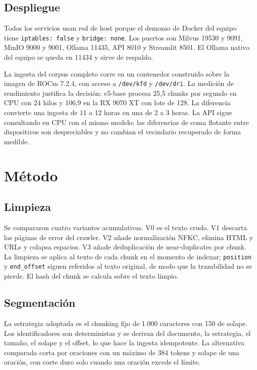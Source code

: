 \documentclass[11pt]{tg_usta}
\begin{document}
\clearpage
\subsection{Despliegue}

Todos los servicios usan red de host porque el demonio de Docker del equipo tiene \texttt{iptables:~false} y \texttt{bridge:~none}. Los puertos son Milvus 19530 y 9091, MinIO 9000 y 9001, Ollama 11435, API 8010 y Streamlit 8501. El Ollama nativo del equipo se queda en 11434 y sirve de respaldo.

La ingesta del corpus completo corre en un contenedor construido sobre la imagen de ROCm 7.2.4, con acceso a \texttt{/dev/kfd} y \texttt{/dev/dri}. La medición de rendimiento justifica la decisión: e5-base procesa 25,5 chunks por segundo en CPU con 24 hilos y 106,9 en la RX 9070 XT con lote de 128. La diferencia convierte una ingesta de 11 a 12 horas en una de 2 a 3 horas. La API sigue consultando en CPU con el mismo modelo; las diferencias de coma flotante entre dispositivos son despreciables y no cambian el vecindario recuperado de forma medible.

\section{Método}

\subsection{Limpieza}

Se compararon cuatro variantes acumulativas. V0 es el texto crudo. V1 descarta las páginas de error del crawler. V2 añade normalización NFKC, elimina HTML y URLs y colapsa espacios. V3 añade deduplicación de near-duplicates por chunk. La limpieza se aplica al texto de cada chunk en el momento de indexar; \texttt{position} y \texttt{end\_offset} siguen referidos al texto original, de modo que la trazabilidad no se pierde. El hash del chunk se calcula sobre el texto limpio.

\subsection{Segmentación}

La estrategia adoptada es el chunking fijo de 1.000 caracteres con 150 de solape. Los identificadores son deterministas y se derivan del documento, la estrategia, el tamaño, el solape y el offset, lo que hace la ingesta idempotente. La alternativa comparada corta por oraciones con un máximo de 384 tokens y solape de una oración, con corte duro solo cuando una oración excede el límite.
\end{document}
